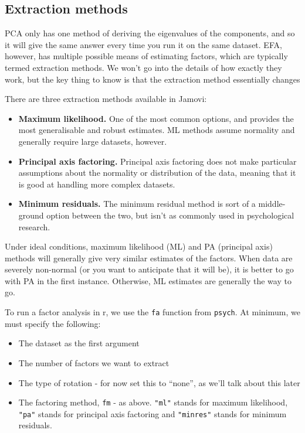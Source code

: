 \documentclass[
]{book}
\providecommand{\tightlist}{%
  \setlength{\itemsep}{0pt}\setlength{\parskip}{0pt}}
\begin{document}
\subsection{Extraction methods}\label{extraction-methods}

PCA only has one method of deriving the eigenvalues of the components, and so it will give the same answer every time you run it on the same dataset. EFA, however, has multiple possible means of estimating factors, which are typically termed extraction methods. We won't go into the details of how exactly they work, but the key thing to know is that the extraction method essentially changes

There are three extraction methods available in Jamovi:

\begin{itemize}
\tightlist
\item
  \textbf{Maximum likelihood.} One of the most common options, and provides the most generalisable and robust estimates. ML methods assume normality and generally require large datasets, however.
\item
  \textbf{Principal axis factoring.} Principal axis factoring does not make particular assumptions about the normality or distribution of the data, meaning that it is good at handling more complex datasets.
\item
  \textbf{Minimum residuals.} The minimum residual method is sort of a middle-ground option between the two, but isn't as commonly used in psychological research.
\end{itemize}

Under ideal conditions, maximum likelihood (ML) and PA (principal axis) methods will generally give very similar estimates of the factors. When data are severely non-normal (or you want to anticipate that it will be), it is better to go with PA in the first instance. Otherwise, ML estimates are generally the way to go.

To run a factor analysis in r, we use the \texttt{fa} function from \texttt{psych}. At minimum, we must specify the following:

\begin{itemize}
\tightlist
\item
  The dataset as the first argument
\item
  The number of factors we want to extract
\item
  The type of rotation - for now set this to ``none'', as we'll talk about this later
\item
  The factoring method, \texttt{fm} - as above. \texttt{"ml"} stands for maximum likelihood, \texttt{"pa"} stands for principal axis factoring and \texttt{"minres"} stands for minimum residuals.
\end{itemize}
\end{document}
